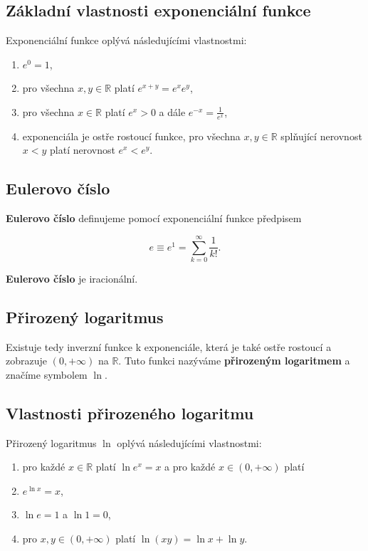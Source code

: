 \subsection*{Základní vlastnosti exponenciální funkce}

Exponenciální funkce oplývá následujícími vlastnostmi:

\begin{enumerate}
    \item $e^0 = 1$,
    \item pro všechna $x,y\in\mathbb{R}$ platí $e^{x+y} = e^x e^y$,
    \item pro všechna $x\in\mathbb{R}$ platí $e^x > 0$ a dále $e^{-x} = \frac{1}{e^x}$,
    \item exponenciála je ostře rostoucí funkce, pro všechna $x,y \in \mathbb{R}$
          splňující nerovnost $x < y$ platí nerovnost $e^x < e^y$.
\end{enumerate}

\subsection*{Eulerovo číslo}
\textbf{Eulerovo číslo} definujeme pomocí exponenciální funkce předpisem

\[ e \equiv e^1 = \sum_{k=0}^\infty \frac{1}{k!}. \]

\noindent \textbf{Eulerovo číslo} je iracionální.

\subsection*{Přirozený logaritmus}

Existuje tedy inverzní funkce k exponenciále, která je také ostře rostoucí a
zobrazuje $(0,+\infty)$ na $\mathbb{R}$. Tuto funkci nazýváme
\textbf{přirozeným logaritmem} a značíme symbolem $\ln$.

\subsection*{Vlastnosti přirozeného logaritmu}

Přirozený logaritmus $\ln$ oplývá následujícími vlastnostmi:

\begin{enumerate}
    \item pro každé $x\in\mathbb{R}$ platí $\ln e^x = x$ a pro každé $x\in(0,+\infty)$
          platí
    \item $e^{\ln x} = x$,
    \item $\ln e = 1$ a $\ln 1 = 0$,
    \item pro $x,y \in (0,+\infty)$ platí $\ln(xy) = \ln x + \ln y$.
\end{enumerate}


